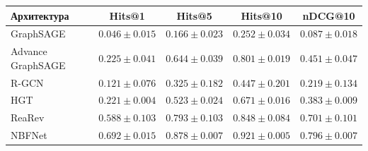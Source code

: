 \begin{tabular}{lcccc}
\toprule
Архитектура & Hits@1 & Hits@5 & Hits@10 & nDCG@10 \\
\midrule
GraphSAGE & $0.046 \pm 0.015$ & $0.166 \pm 0.023$ & $0.252 \pm 0.034$ & $0.087 \pm 0.018$ \\
Advance GraphSAGE & $0.225 \pm 0.041$ & $0.644 \pm 0.039$ & $0.801 \pm 0.019$ & $0.451 \pm 0.047$ \\
R-GCN & $0.121 \pm 0.076$ & $0.325 \pm 0.182$ & $0.447 \pm 0.201$ & $0.219 \pm 0.134$ \\
HGT & $0.221 \pm 0.004$ & $0.523 \pm 0.024$ & $0.671 \pm 0.016$ & $0.383 \pm 0.009$ \\
ReaRev & $0.588 \pm 0.103$ & $0.793 \pm 0.103$ & $0.848 \pm 0.084$ & $0.701 \pm 0.101$ \\
NBFNet & $0.692 \pm 0.015$ & $0.878 \pm 0.007$ & $0.921 \pm 0.005$ & $0.796 \pm 0.007$ \\
\bottomrule
\end{tabular}
